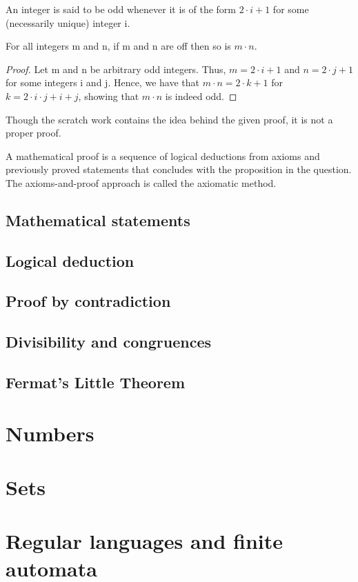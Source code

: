 \documentclass[a4paper]{article}
\begin{document}
\begin{description}
\begin{defi}[7]
An integer is said to be odd whenever it is of the form $2\cdot i + 1$ for some (necessarily unique) integer i.
\end{defi}

\begin{prop}[8]
For all integers m and n, if m and n are off then so is $m\cdot n$.
\end{prop}

\begin{proof}
Let m and n be arbitrary odd integers. Thus, $m = 2\cdot i +1$ and $n = 2\cdot j +1$ for some integers i and j. Hence, we have that $m\cdot n = 2 \cdot k +1$ for $k = 2\cdot i\cdot j +i +j$, showing that $m\cdot n$ is indeed odd.
\end{proof}

\begin{wn}
Though the scratch work contains the idea behind the given proof, it is not a proper proof.
\end{wn}

\end{description}

\begin{defi}
A mathematical proof is a sequence of logical deductions from axioms and previously proved statements that concludes with the proposition in the question.\\
The axioms-and-proof approach is called the axiomatic method. 
\end{defi}

\subsection{Mathematical statements}

\subsection{Logical deduction}
\subsection{Proof by contradiction}
\subsection{Divisibility and congruences}
\subsection{Fermat’s Little Theorem}


\section{Numbers}

\section{Sets}

\section{Regular languages and finite automata}
\end{document}
